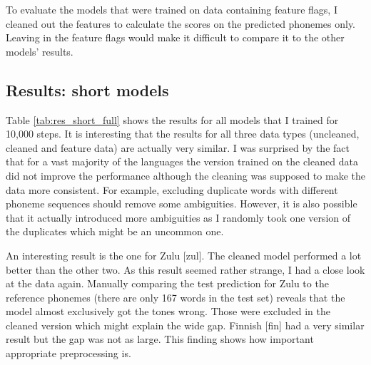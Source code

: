 To evaluate the models that were trained on data containing feature flags, I cleaned out the features to calculate the scores on the predicted phonemes only. Leaving in the feature flags would make it difficult to compare it to the other models' results.
\subsection{Results: short models}
Table \ref{tab:res_short_full} shows the results for all models that I trained for 10,000 steps. It is interesting that the results for all three data types (uncleaned, cleaned and feature data) are actually very similar. I was surprised by the fact that for a vast majority of the languages the version trained on the cleaned data did not improve the performance although the cleaning was supposed to make the data more consistent. For example, excluding duplicate words with different phoneme sequences should remove some ambiguities. However, it is also possible that it actually introduced more ambiguities as I randomly took one version of the duplicates which might be an uncommon one.  

An interesting result is the one for Zulu [zul]. The cleaned model performed a lot better than the other two. As this result seemed rather strange, I had a close look at the data again. Manually comparing the test prediction for Zulu to the reference phonemes (there are only 167 words in the test set) reveals that the model almost exclusively got the tones wrong. Those were excluded in the cleaned version which might explain the wide gap. Finnish [fin] had a very similar result but the gap was not as large. This finding shows how important appropriate preprocessing is.

